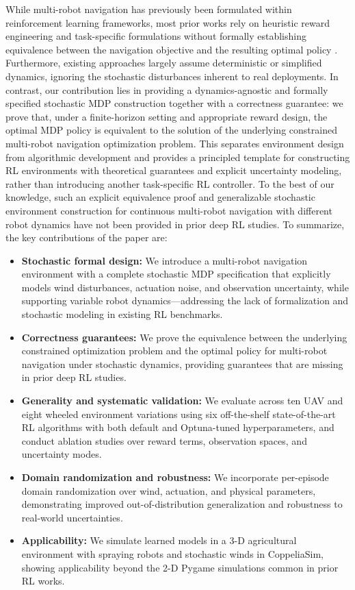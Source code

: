 \documentclass[letterpaper, 10 pt, conference]{ieeeconf}  %
\begin{document}
While multi-robot navigation has previously been formulated within reinforcement learning frameworks, most prior works rely on heuristic reward engineering and task-specific formulations without formally establishing equivalence between the navigation objective and the resulting optimal policy \cite{chen2017icra, everett2018iros, long2017iral, fan2020ijrr, han2022iral}. Furthermore, existing approaches largely assume deterministic or simplified dynamics, ignoring the stochastic disturbances inherent to real deployments. In contrast, our contribution lies in providing a dynamics-agnostic and formally specified stochastic MDP construction together with a correctness guarantee: we prove that, under a finite-horizon setting and appropriate reward design, the optimal MDP policy is equivalent to the solution of the underlying constrained multi-robot navigation optimization problem. This separates environment design from algorithmic development and provides a principled template for constructing RL environments with theoretical guarantees and explicit uncertainty modeling, rather than introducing another task-specific RL controller. To the best of our knowledge, such an explicit equivalence proof and generalizable stochastic environment construction for continuous multi-robot navigation with different robot dynamics have not been provided in prior deep RL studies. To summarize, the key contributions of the paper are:
\begin{itemize}
    \item
\textbf{Stochastic formal design:} We introduce a multi-robot navigation environment with a complete stochastic MDP specification that explicitly models wind disturbances, actuation noise, and observation uncertainty, while supporting variable robot dynamics—addressing the lack of formalization and stochastic modeling in existing RL benchmarks.
\item
\textbf{Correctness guarantees:} We prove the equivalence between the underlying constrained optimization problem and the optimal policy for multi-robot navigation under stochastic dynamics, providing guarantees that are missing in prior deep RL studies.
\item
\textbf{Generality and systematic validation:} We evaluate across ten UAV and eight wheeled environment variations using six off-the-shelf state-of-the-art RL algorithms with both default and Optuna-tuned hyperparameters, and conduct ablation studies over reward terms, observation spaces, and uncertainty modes.
\item
\textbf{Domain randomization and robustness:} We incorporate per-episode domain randomization over wind, actuation, and physical parameters, demonstrating improved out-of-distribution generalization and robustness to real-world uncertainties.
\item
\textbf{Applicability:} We simulate learned models in a 3-D agricultural environment with spraying robots and stochastic winds in CoppeliaSim, showing applicability beyond the 2-D Pygame simulations common in prior RL works.
\end{itemize}
\end{document}
